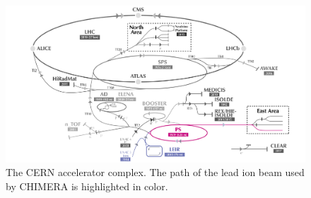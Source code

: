 \begin{figure}[!htb]
\centering
\includegraphics[width=1.0\textwidth]{images/CCC_eastt8_small.png}
\caption{The CERN accelerator complex. The path of the lead ion beam used by CHIMERA is highlighted in color.}
\label{fig:CCC}
\end{figure}